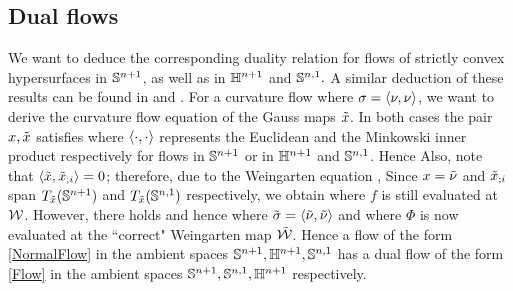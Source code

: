 \subsection{Dual flows}
We want to deduce the corresponding duality relation for flows of strictly convex hypersurfaces in $\S^{n+1}$, as well as in $\H^{n+1}$ and $\S^{n,1}.$ A similar deduction of these results can be found in \cite[Sec.~4]{Gerhardt:/2015} and \cite{Yu:04/2016}.
For a curvature flow
where $\s=\ip{\nu}{\nu}$, we want to derive the curvature flow equation of the Gauss maps $\~x$. In both cases the pair $x,\~x$ satisfies
where $\ip{\cdot}{\cdot}$ represents the Euclidean and the Minkowski inner product respectively for flows in $\S^{n+1}$ or in $\H^{n+1}$ and $\S^{n,1}$.
Hence
 Also, note that $\ip{\~x}{\~x_{;i}}=0$; therefore, due to the Weingarten equation \cite[Lem.~9.2.4, Lem.~10.4.3]{Gerhardt:/2006},
Since $x=\~\nu$ and $\~x_{;i}$ span $T_{\~x}(\S^{n+1})$ and $T_{\~x}(\S^{n,1})$ respectively, we obtain
where $f$ is still evaluated at $\mc{W}$. However, there holds
and hence
where $\~\s=\ip{\~\nu}{\~\nu}$ and where $\Phi$ is now evaluated at the ``correct" Weingarten map $\~{\mc{W}}$. Hence a flow of the form
\eqref{NormalFlow} in the ambient spaces $\S^{n+1}, \H^{n+1},\S^{n,1}$ has a dual flow of the form \eqref{Flow} in the ambient spaces $\S^{n+1}, \S^{n,1},\H^{n+1}$ respectively.
